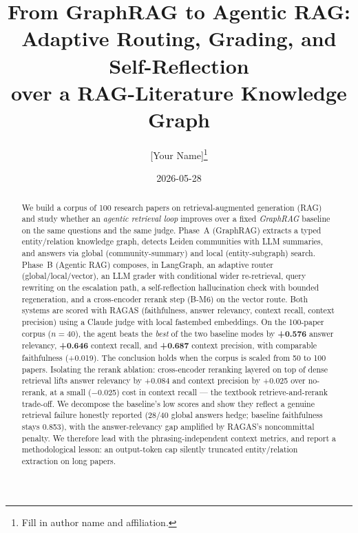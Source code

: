 \documentclass[11pt]{article}
\title{\textbf{From GraphRAG to Agentic RAG:}\\[2pt]
Adaptive Routing, Grading, and Self-Reflection\\ over a RAG-Literature Knowledge Graph}
\author{[Your Name]\thanks{Fill in author name and affiliation.}}   %
\date{2026-05-28}
\begin{document}
\maketitle

\begin{abstract}
We build a corpus of 100 research papers on retrieval-augmented generation (RAG) and study whether an \emph{agentic retrieval loop} improves over a fixed \emph{GraphRAG} baseline on the same questions and the same judge. Phase~A (GraphRAG) extracts a typed entity/relation knowledge graph, detects Leiden communities with LLM summaries, and answers via global (community-summary) and local (entity-subgraph) search. Phase~B (Agentic RAG) composes, in LangGraph, an adaptive router (global/local/vector), an LLM grader with conditional wider re-retrieval, query rewriting on the escalation path, a self-reflection hallucination check with bounded regeneration, and a cross-encoder rerank step (B-M6) on the vector route. Both systems are scored with RAGAS (faithfulness, answer relevancy, context recall, context precision) using a Claude judge with local fastembed embeddings. On the 100-paper corpus ($n{=}40$), the agent beats the \emph{best} of the two baseline modes by \textbf{+0.576} answer relevancy, \textbf{+0.646} context recall, and \textbf{+0.687} context precision, with comparable faithfulness (+0.019). The conclusion holds when the corpus is scaled from 50 to 100 papers. Isolating the rerank ablation: cross-encoder reranking layered on top of dense retrieval lifts answer relevancy by +0.084 and context precision by +0.025 over no-rerank, at a small ($-$0.025) cost in context recall --- the textbook retrieve-and-rerank trade-off. We decompose the baseline's low scores and show they reflect a genuine retrieval failure honestly reported (28/40 global answers hedge; baseline faithfulness stays 0.853), with the answer-relevancy gap amplified by RAGAS's noncommittal penalty. We therefore lead with the phrasing-independent context metrics, and report a methodological lesson: an output-token cap silently truncated entity/relation extraction on long papers.
\end{abstract}
\end{document}

